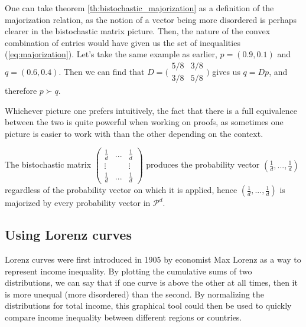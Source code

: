 One can take theorem \ref{th:bistochastic_majorization} as a definition of the majorization relation, as the notion of a vector being more disordered is perhaps clearer in the bistochastic matrix picture. Then, the nature of the convex combination %
of entries would have given us the set of inequalities (\ref{eq:majorization}). Let's take the same example as earlier, $p = (0.9, 0.1)$ and $q = (0.6, 0.4)$. Then we can find that $D = \Big(\begin{smallmatrix}
                                                                                                    5/8 & 3/8 \\
                                                                                                    3/8 & 5/8
                                                                                                \end{smallmatrix}\Big)$
gives us $q = Dp$, and therefore $p \succ q$.

Whichever picture one prefers intuitively, the fact that there is a full equivalence between the two is quite powerful when working on proofs, as sometimes one picture is easier to work with than the other depending on the context.

\begin{remark}
    The bistochastic matrix $\begin{pmatrix} \frac{1}{d} & ... & \frac{1}{d} \\
                                                      \vdots & & \vdots \\
                                                      \frac{1}{d} & ... & \frac{1}{d}
                             \end{pmatrix}$ 
    produces the probability vector $(\frac{1}{d}, ..., \frac{1}{d})$ regardless of the probability vector on which it is applied, hence $(\frac{1}{d}, ..., \frac{1}{d})$ is majorized by every probability vector in $\mathcal{P}^d$.
\end{remark}



\subsection{Using Lorenz curves}

Lorenz curves were first introduced in 1905 by economist Max Lorenz as a way to represent income inequality. By plotting the cumulative sums of two distributions, we can say that if one curve is above the other at all times, then it is more unequal (more disordered) than the second. By normalizing the distributions for total income, this graphical tool could then be used to quickly compare income inequality between different regions or countries.

